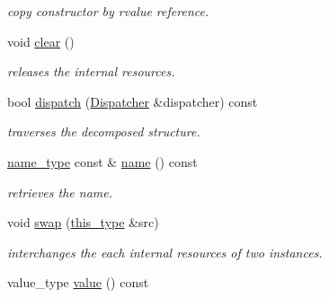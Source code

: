 \begin{DoxyCompactItemize}
\begin{DoxyCompactList}\small\item\em copy constructor by rvalue reference. \end{DoxyCompactList}\item 
\hypertarget{classhryky_1_1reduction_1_1_char_a387c79f89df1d493b6769d3f7ad1465f}{void \hyperlink{classhryky_1_1reduction_1_1_char_a387c79f89df1d493b6769d3f7ad1465f}{clear} ()}\label{classhryky_1_1reduction_1_1_char_a387c79f89df1d493b6769d3f7ad1465f}

\begin{DoxyCompactList}\small\item\em releases the internal resources. \end{DoxyCompactList}\item 
bool \hyperlink{classhryky_1_1reduction_1_1_base_a71b31d4d0ed915254e2cb1ef217f28c4}{dispatch} (\hyperlink{classhryky_1_1reduction_1_1_dispatcher}{Dispatcher} \&dispatcher) const 
\begin{DoxyCompactList}\small\item\em traverses the decomposed structure. \end{DoxyCompactList}\item 
\hypertarget{classhryky_1_1reduction_1_1_base_a842569265d741905eb8a353d3935f1d1}{\hyperlink{namespacehryky_1_1reduction_ac686c30a4c8d196bbd0f05629a6b921f}{name\-\_\-type} const \& \hyperlink{classhryky_1_1reduction_1_1_base_a842569265d741905eb8a353d3935f1d1}{name} () const }\label{classhryky_1_1reduction_1_1_base_a842569265d741905eb8a353d3935f1d1}

\begin{DoxyCompactList}\small\item\em retrieves the name. \end{DoxyCompactList}\item 
\hypertarget{classhryky_1_1reduction_1_1_char_a21bcc7975a56422de95aeca5c792eefb}{void \hyperlink{classhryky_1_1reduction_1_1_char_a21bcc7975a56422de95aeca5c792eefb}{swap} (\hyperlink{classhryky_1_1reduction_1_1_base_af02a7dee6042080b7380afd2f9500a42}{this\-\_\-type} \&src)}\label{classhryky_1_1reduction_1_1_char_a21bcc7975a56422de95aeca5c792eefb}

\begin{DoxyCompactList}\small\item\em interchanges the each internal resources of two instances. \end{DoxyCompactList}\item 
\hypertarget{classhryky_1_1reduction_1_1_char_a037af547fcd0e0544ae8b929f94f3b4f}{value\-\_\-type \hyperlink{classhryky_1_1reduction_1_1_char_a037af547fcd0e0544ae8b929f94f3b4f}{value} () const }\label{classhryky_1_1reduction_1_1_char_a037af547fcd0e0544ae8b929f94f3b4f}


\end{DoxyCompactItemize}
